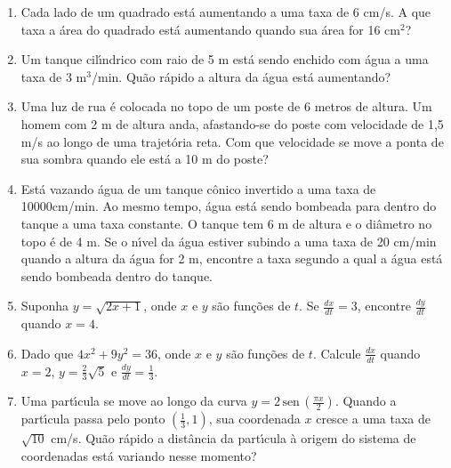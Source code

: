 \documentclass[a4paper,5pt]{amsbook}
\newcommand{\sen}{\,\mbox{sen}\,}
\newcommand{\ds}{\displaystyle}
\begin{document}
\begin{enumerate}
    \vspace{0.5cm}
    \item Cada lado de um quadrado est\'a aumentando a uma taxa de 6 cm/s. A
        que taxa a \'area do quadrado est\'a aumentando quando sua \'area for 16
        cm$^2$?

    \vspace{0.5cm}
    \item Um tanque cil\'{\i}ndrico com raio de 5 m est\'a sendo enchido com \'agua a
        uma taxa de 3 m$^3$/min. Qu\~ao r\'apido a altura da \'agua est\'a
        aumentando?

    \vspace{0.5cm}
    \item Uma luz de rua \'e colocada no topo de um poste de 6 metros de
        altura. Um homem com 2 m de altura anda, afastando-se do poste com
        velocidade de 1,5 m/s ao longo de uma trajet\'oria reta. Com que
        velocidade se move a ponta de sua sombra quando ele est\'a a 10 m do
        poste?

    \vspace{0.5cm}
    \item Est\'a vazando \'agua de um tanque c\^onico invertido a uma taxa de
        10000cm/min. Ao mesmo tempo, \'agua est\'a sendo bombeada para dentro do
        tanque a uma taxa constante. O tanque tem 6 m de altura e o di\^ametro
        no topo \'e de 4 m. Se o n\'{\i}vel da \'agua estiver subindo a uma taxa de 20
        cm/min quando a altura da \'agua for 2 m, encontre a taxa segundo a
        qual a \'agua est\'a sendo bombeada dentro do tanque.

    \vspace{0.5cm}
    \item Suponha $y=\sqrt{2x+1}$, onde $x$ e $y$ s\~ao fun\c{c}\~oes de $t$.  Se
        $\ds\frac{dx}{dt}=3$, encontre $\ds\frac{dy}{dt}$ quando $x=4$.

    \vspace{0.5cm}
    \item Dado que $4x^2+9y^2=36$, onde $x$ e $y$ s\~ao fun\c{c}\~oes de $t$. Calcule
        $\ds\frac{dx}{dt}$ quando $x=2$, $y=\ds\frac{2}{3}\sqrt{5}$ e
        $\ds\frac{dy}{dt}=\frac{1}{3}$.

    \vspace{0.5cm}
    \item Uma part\'{\i}cula se move ao longo da curva $y=2\ds\sen{\left(\frac{\pi
                    x}{2}\right)}$. Quando a part\'{\i}cula passa pelo ponto
        $\left(\ds\frac{1}{3},1\right)$, sua coordenada $x$ cresce a uma taxa
        de $\sqrt{10}$ cm/s. Qu\~ao r\'apido a dist\^ancia da part\'{\i}cula \`a origem do
        sistema de coordenadas est\'a variando nesse momento?


\end{enumerate}
\end{document}
